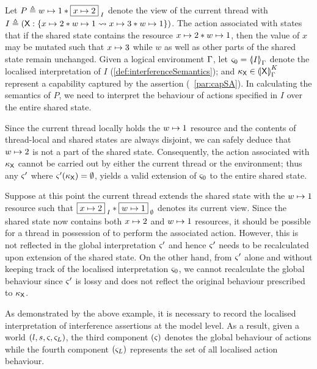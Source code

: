 \begin{example}[]Let $P \eqdef \cell{w}{1} * \shared{\cell{x}{2}}{I}$ denote the view of the current thread with $I \eqdef \left(\token{X}: \left\{\cell{x}{2} * \cell{w}{1} \swap \cell{x}{3} * \cell{w}{1}\right\}\right)$. The action associated with  states that if the shared state contains the resource $\cell{x}{2} * \cell{w}{1}$, then the value of $x$ may be mutated such that $\cell{x}{3}$ while $w$ as well as other parts of the shared state remain unchanged. Given a logical environment $\lenv$, let $\amod{0} = \semI[\lenv]{I}$ denote the localised interpretation of $I$ (\ref{def:interferenceSemantics}); and $\ca{\textsf{X}} \in  \semK[\lenv]{\token{X}}$ represent a capability captured by the assertion  (\param~\ref{par:capSA}). In calculating the semantics of $P$, we need to interpret the behaviour of actions specified in $I$ over the entire shared state.

Since the current thread locally holds the $\cell{w}{1}$ resource and the contents of thread-local and shared states are always disjoint, we can safely deduce that $\cell{w}{2}$ is not a part of the shared state. Consequently, the action associated with $\ca{\textsf{X}}$ cannot be carried out by either the current thread or the environment; thus any $\amod{}'$ where $\amod{}'(\ca{\textsf{X}}) = \emptyset$, yields a valid extension of $\amod{0}$ to the entire shared state.

Suppose at this point the current thread extends the shared state with the $\cell{w}{1}$ resource such that $\shared{\cell{x}{2}}{I} * \shared{\cell{w}{1}}{\emptyset}$ denotes its current view. Since the shared state now contains both $\cell{x}{2}$ and $\cell{w}{1}$ resources, it should be possible for a thread in possession of  to perform the associated action. However, this is not reflected in the global interpretation $\amod{}'$ and hence $\amod{}'$ needs to be recalculated upon extension of the shared state. On the other hand, from $\amod{}'$ alone and without keeping track of the localised interpretation $\amod{0}$, we cannot recalculate the global behaviour since $\amod{}'$ is lossy and does not reflect the original behaviour prescribed to $\ca{\textsf{X}}$.
\end{example}
%
%
As demonstrated by the above example, it is necessary to record the localised interpretation of interference assertions at the model level. As a result, given a world $(l, s, \amod{}, \amod{L})$, the third component $(\amod{})$ denotes the global behaviour of actions while the fourth component $(\amod{L})$ represents the set of all localised action behaviour.
%
%
